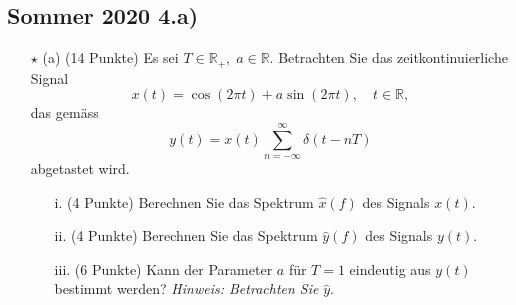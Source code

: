 \documentclass[11pt]{article}
\begin{document}
\subsection*{Sommer 2020 4.a)}
\vspace*{-0.5cm}
\begin{itemize}
    \item[$\star$] (a) (14 Punkte) Es sei $T \in \mathbb{R}_+, \; a \in \mathbb{R}$. Betrachten Sie das zeitkontinuierliche Signal
    $$x(t) = \cos(2 \pi t) + a \sin(2 \pi t), \hspace{12pt} t \in \mathbb{R},$$
    das gemäss
    $$y(t) = x(t)\sum_{n = - \infty}^{\infty} \delta(t-nT)$$
    abgetastet wird.
    \item[] \begin{itemize}
        \item[i.] (4 Punkte) Berechnen Sie das Spektrum $\hat{x}(f)$ des Signals $x(t)$.
        \item[ii.] (4 Punkte) Berechnen Sie das Spektrum $\hat{y}(f)$ des Signals $y(t)$.
        \item[iii.] (6 Punkte) Kann der Parameter $a$ für $T=1$ eindeutig aus $y(t)$ bestimmt werden? \textit{Hinweis: Betrachten Sie } $\hat{y}$.
    \end{itemize}
\end{itemize}

\vfill \null
\pagebreak

\end{document}
